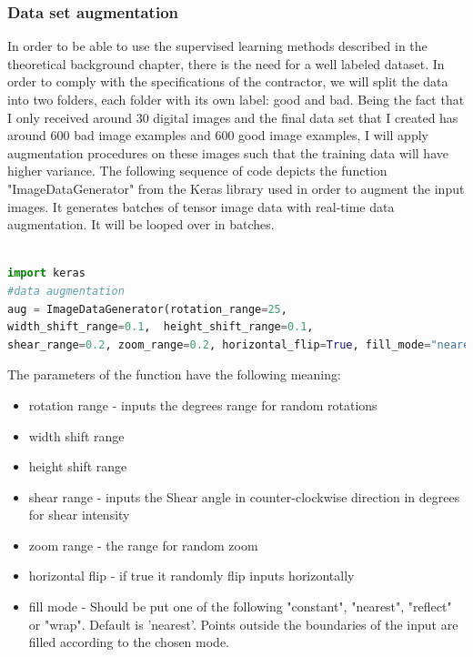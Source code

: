 \documentclass[12pt,a4paper,twoside]{report}
\begin{document}
\subsubsection{Data set augmentation}
In order to be able to use the supervised learning methods described in the theoretical background chapter, there is the need for a well labeled dataset. In order to comply with the specifications of the contractor, we will split the data into two folders, each folder with its own label: good and bad. Being the fact that I only received around 30 digital images and the final data set that I created has around 600 bad image examples and 600 good image examples, I will apply augmentation procedures on these images such that the training data will have higher variance. The following sequence of code depicts the function "ImageDataGenerator" from the Keras library used in order to augment the input images. It generates batches of tensor image data with real-time data augmentation. It will be looped over in batches.

\begin{lstlisting}[language=Python, basicstyle=\small, caption={Data augmenting script},captionpos=b, label=code:datapreparation]

import keras
#data augmentation
aug = ImageDataGenerator(rotation_range=25,
width_shift_range=0.1,	height_shift_range=0.1,
shear_range=0.2, zoom_range=0.2, horizontal_flip=True, fill_mode="nearest")
\end{lstlisting}

The parameters of the function have the following meaning:
\begin{itemize}
    \item rotation range - inputs the degrees range for random rotations
    \item width shift range
    \item height shift range
    \item shear range - inputs the Shear angle in counter-clockwise direction in degrees for shear intensity
    \item zoom range - the range for random zoom
    \item horizontal flip - if true it randomly flip inputs horizontally
    \item fill mode - Should be put one of the following {"constant", "nearest", "reflect" or "wrap"}. Default is 'nearest'. Points outside the boundaries of the input are filled according to the chosen mode.
\end{itemize}
\end{document}

